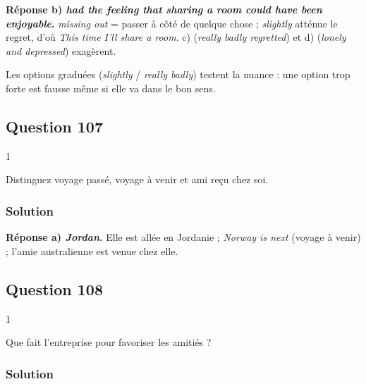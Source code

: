 \documentclass[11pt,a4paper]{article}
\begin{document}
\textbf{Réponse b) \emph{had the feeling that sharing a room could have been enjoyable}.} \emph{missing out} = passer à côté de quelque chose ; \emph{slightly} atténue le regret, d'où \emph{This time I'll share a room}. c) (\emph{really badly regretted}) et d) (\emph{lonely and depressed}) exagèrent.

\begin{piege}

Les options graduées (\emph{slightly} / \emph{really badly}) testent la nuance : une option trop forte est fausse même si elle va dans le bon sens.

\end{piege}

\hypertarget{question-107}{%
\subsection{Question 107}\label{question-107}}

\begin{indication}{1}

Distinguez voyage passé, voyage à venir et ami reçu chez soi.

\end{indication}

\hypertarget{solution-106}{%
\subsubsection{Solution}\label{solution-106}}

\textbf{Réponse a) \emph{Jordan}.} Elle est allée en Jordanie ; \emph{Norway is next} (voyage à venir) ; l'amie australienne est venue chez elle.

\hypertarget{question-108}{%
\subsection{Question 108}\label{question-108}}

\begin{indication}{1}

Que fait l'entreprise pour favoriser les amitiés ?

\end{indication}

\hypertarget{solution-107}{%
\subsubsection{Solution}\label{solution-107}}
\end{document}
